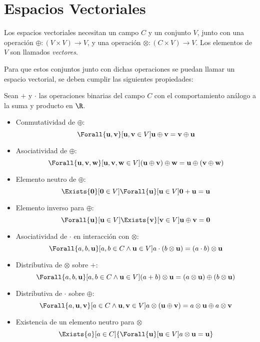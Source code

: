 \section{Espacios Vectoriales}

Los espacios vectoriales necesitan un campo $C$ y un conjunto $V$, junto
con una operación $\oplus : (V\times V) \to V$, y una operación
$\otimes : (C \times V) \to V$. Los elementos de $V$ son llamados \emph{vectores}.

Para que estos conjuntos junto con dichas operaciones se puedan llamar un espacio
vectorial, se deben cumplir las siguientes propiedades:

Sean $+$ y $\cdot$ las operaciones binarias del campo $C$ con el comportamiento análogo
a la suma y producto en $\R$.


\begin{itemize}
  \item Conmutatividad de $\oplus$:
  \[
    \Forall{\mathbf{u},\mathbf{v}}[\mathbf{u},\mathbf{v}\in V]{
      \mathbf{u} \oplus \mathbf{v} = \mathbf{v} \oplus \mathbf{u}  
    }
  \]
  \item Asociatividad de $\oplus$:
  \[
    \Forall{\mathbf{u},\mathbf{v},\mathbf{w}}[
      \mathbf{u},\mathbf{v},\mathbf{w}\in V
    ]{
      (\mathbf{u} \oplus \mathbf{v}) \oplus \mathbf{w} =
      \mathbf{u} \oplus (\mathbf{v} \oplus \mathbf{w})
    }
  \]
  \item Elemento neutro de $\oplus$:
  \[
    \Exists{\mathbf{0}}[\mathbf{0}\in V]{ 
      \Forall{\mathbf{u}}[\mathbf{u}\in V]{
        \mathbf{0} + \mathbf{u} = \mathbf{u}
      }
    }
  \]
  \item Elemento inverso para $\oplus$:
  \[
    \Forall{\mathbf{u}}[\mathbf{u} \in V]{
      \Exists{\mathbf{v}}[\mathbf{v} \in V]{
        \mathbf{u} \oplus \mathbf{v} = \mathbf{0}
      }
    }
  \]
  \item Asociatividad de $\cdot$ en interacción con $\otimes$:
  \[
    \Forall{a,b,\mathbf{u}}[
      a,b \in C \land \mathbf{u} \in V
    ]{
      a\cdot(b\otimes\mathbf{u}) = (a\cdot b)\otimes\mathbf{u}
    }
  \]
  \item Distributiva de $\otimes$ sobre $+$:
  \[
    \Forall{a,b,\mathbf{u}}[
      a,b \in C \land \mathbf{u} \in V
    ]{
      (a + b)\otimes\mathbf{u} = (a\otimes\mathbf{u}) \oplus (b\otimes\mathbf{u})
    }
  \]
  \item Distributiva de $\cdot$ sobre $\oplus$:
  \[
    \Forall{a,\mathbf{u},\mathbf{v}}[
      a \in C \land \mathbf{u},\mathbf{v} \in V
    ]{
      a \otimes (\mathbf{u} \oplus \mathbf{v}) = a\otimes\mathbf{u} \oplus a\otimes\mathbf{v}
    }
  \]
  \item Existencia de un elemento neutro para $\otimes$
  \[
    \Exists{a}[a \in C]{
      \Forall{\mathbf{u}}[\mathbf{u} \in V]{
        a\otimes\mathbf{u} = \mathbf{u}
      }
    }
  \]
\end{itemize}

